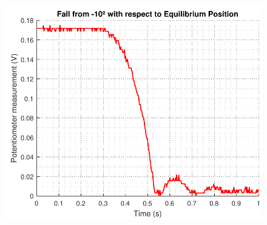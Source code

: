 \begin{minipage}{\linewidth}
	\begin{minipage}{0.45\linewidth}
		\begin{figure}[H]
			\includegraphics[scale=.53]{figures/tenDegFallVolt}
			\centering
			\vspace{-.4cm}
			\captionsetup{justification=centering}
			\label{tenDegFallVolt}
		\end{figure}\vspace{-5mm}
	\end{minipage}
	\hspace{0.03\linewidth}
	\begin{minipage}{0.45\linewidth}
		\begin{figure}[H]


\end{figure}
\end{minipage}
\end{minipage}
